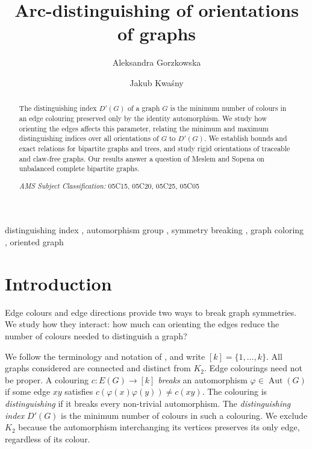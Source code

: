\documentclass[a4paper,12pt]{elsarticle}
\newcommand{\Aut}{\ensuremath{\operatorname{Aut}}}
\begin{document}
\title{Arc-distinguishing of orientations of graphs}

\author[AGH]{Aleksandra Gorzkowska} 

\author[AGH]{Jakub Kwa\'sny} 

\address[AGH]{AGH University of Krakow, al. A. Mickiewicza 30, 30-059 Krakow, Poland}



\begin{abstract}
The distinguishing index $D'(G)$ of a graph $G$ is the minimum number of colours in an edge colouring preserved only by the identity automorphism. We study how orienting the edges affects this parameter, relating the minimum and maximum distinguishing indices over all orientations of $G$ to $D'(G)$. We establish bounds and exact relations for bipartite graphs and trees, and study rigid orientations of traceable and claw-free graphs. Our results answer a question of Meslem and Sopena on unbalanced complete bipartite graphs.

\noindent\emph{AMS Subject Classification:} 05C15, 05C20, 05C25, 05C05
\end{abstract}

\begin{keyword}
distinguishing index  \sep
automorphism group \sep
symmetry breaking \sep
graph coloring \sep
oriented graph
\end{keyword}

\maketitle


\section{Introduction}

Edge colours and edge directions provide two ways to break graph symmetries. We study how they interact: how much can orienting the edges reduce the number of colours needed to distinguish a graph?

We follow the terminology and notation of \cite{west}, and write $[k]=\{1,\ldots,k\}$. All graphs considered are connected and distinct from $K_2$. Edge colourings need not be proper. A colouring $c\colon E(G)\to[k]$ \emph{breaks} an automorphism $\varphi\in\Aut(G)$ if some edge $xy$ satisfies $c(\varphi(x)\varphi(y))\neq c(xy)$. The colouring is \emph{distinguishing} if it breaks every non-trivial automorphism. The \emph{distinguishing index} $D'(G)$ is the minimum number of colours in such a colouring. We exclude $K_2$ because the automorphism interchanging its vertices preserves its only edge, regardless of its colour.
\end{document}
